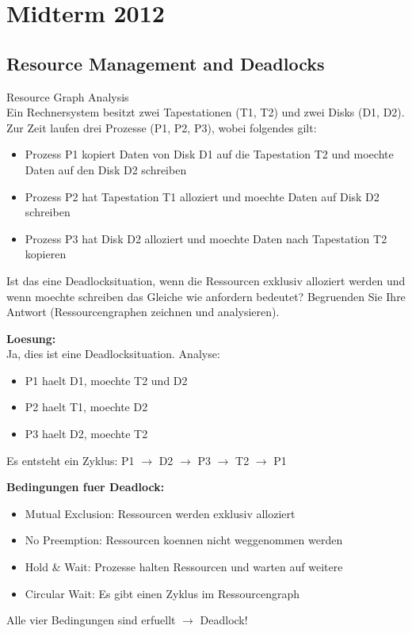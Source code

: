 \section{Midterm 2012}

\subsection{Resource Management and Deadlocks}

\begin{example2}{Resource Graph Analysis}\\
    Ein Rechnersystem besitzt zwei Tapestationen (T1, T2) und zwei Disks (D1, D2). Zur Zeit laufen drei Prozesse (P1, P2, P3), wobei folgendes gilt:
    \begin{itemize}
        \item Prozess P1 kopiert Daten von Disk D1 auf die Tapestation T2 und moechte Daten auf den Disk D2 schreiben
        \item Prozess P2 hat Tapestation T1 alloziert und moechte Daten auf Disk D2 schreiben
        \item Prozess P3 hat Disk D2 alloziert und moechte Daten nach Tapestation T2 kopieren
    \end{itemize}
    
    Ist das eine Deadlocksituation, wenn die Ressourcen exklusiv alloziert werden und wenn moechte schreiben das Gleiche wie anfordern bedeutet? Begruenden Sie Ihre Antwort (Ressourcengraphen zeichnen und analysieren).
    
    \tcblower
    
    \textbf{Loesung:}\\
    Ja, dies ist eine Deadlocksituation. Analyse:
    \begin{itemize}
        \item P1 haelt D1, moechte T2 und D2
        \item P2 haelt T1, moechte D2  
        \item P3 haelt D2, moechte T2
    \end{itemize}
    
    Es entsteht ein Zyklus: P1 $\rightarrow$ D2 $\rightarrow$ P3 $\rightarrow$ T2 $\rightarrow$ P1
    
    \textbf{Bedingungen fuer Deadlock:}
    \begin{itemize}
        \item Mutual Exclusion: Ressourcen werden exklusiv alloziert
        \item No Preemption: Ressourcen koennen nicht weggenommen werden
        \item Hold \& Wait: Prozesse halten Ressourcen und warten auf weitere
        \item Circular Wait: Es gibt einen Zyklus im Ressourcengraph
    \end{itemize}
    
    Alle vier Bedingungen sind erfuellt $\rightarrow$ Deadlock!
\end{example2}

